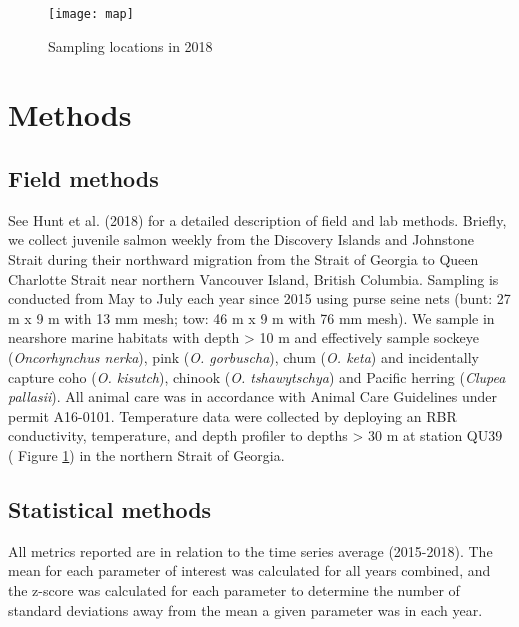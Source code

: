 \documentclass[fleqn,10pt]{wlpeerj} %
\begin{document}
\begin{figure}[H]

\texttt{[image: map]} \hfill{}

\caption{Sampling locations in 2018}\label{fig:map}
\end{figure}

\section*{Methods}\label{methods}

\subsection*{Field methods}\label{field-methods}

See Hunt et al. (2018) for a detailed description of field and lab
methods. Briefly, we collect juvenile salmon weekly from the Discovery
Islands and Johnstone Strait during their northward migration from the
Strait of Georgia to Queen Charlotte Strait near northern Vancouver
Island, British Columbia. Sampling is conducted from May to July each
year since 2015 using purse seine nets (bunt: 27 m x 9 m with 13 mm
mesh; tow: 46 m x 9 m with 76 mm mesh). We sample in nearshore marine
habitats with depth \textgreater{} 10 m and effectively sample sockeye
(\emph{Oncorhynchus nerka}), pink (\emph{O. gorbuscha}), chum (\emph{O.
keta}) and incidentally capture coho (\emph{O. kisutch}), chinook
(\emph{O. tshawytschya}) and Pacific herring (\emph{Clupea pallasii}).
All animal care was in accordance with Animal Care Guidelines under
permit A16-0101. Temperature data were collected by deploying an RBR
conductivity, temperature, and depth profiler to depths \textgreater{}
30 m at station QU39 ( Figure \ref{fig:map}) in the northern Strait of
Georgia.

\subsection*{Statistical methods}\label{statistical-methods}

All metrics reported are in relation to the time series average
(2015-2018). The mean for each parameter of interest was calculated for
all years combined, and the z-score was calculated for each parameter to
determine the number of standard deviations away from the mean a given
parameter was in each year.
\end{document}
